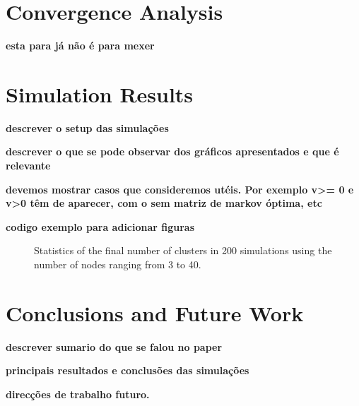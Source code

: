 \documentclass[letterpaper, 10 pt, conference]{ieeeconf}
\begin{document}
\section{Convergence Analysis} \label{sec:convergence}
\textbf{esta para já não é para mexer}

\section{Simulation Results} \label{sec:simulations}
\textbf{descrever o setup das simulações}

\textbf{descrever o que se pode observar dos gráficos apresentados e que é relevante}

\textbf{devemos mostrar casos que consideremos utéis. Por exemplo v>= 0 e v>0 têm de aparecer, com o sem matriz de markov óptima, etc}

\textbf{codigo exemplo para adicionar figuras}
\begin{figure}
	\centering
	\caption{Statistics of the final number of clusters in 200 simulations using the number of nodes ranging from 3 to 40.}
	\label{fig:sim200}
\end{figure}


\section{Conclusions and Future Work} \label{sec:conclusions}
\textbf{descrever sumario do que se falou no paper}

\textbf{principais resultados e conclusões das simulações}

\textbf{direcções de trabalho futuro.}



\end{document}
